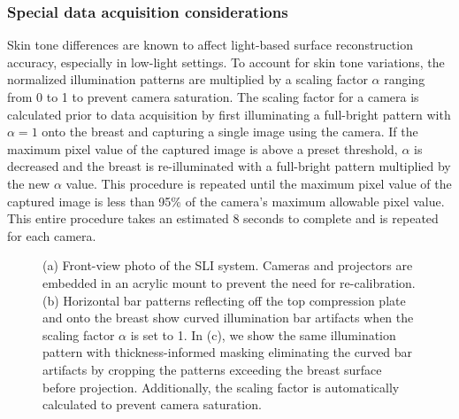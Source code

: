 \subsubsection{Special data acquisition considerations}\label{sec:special}
Skin tone differences are known to affect light-based surface reconstruction accuracy, especially in low-light settings. To account for skin tone variations, the normalized illumination patterns are multiplied by a scaling factor $\alpha$ ranging from 0 to 1 to prevent camera saturation. The scaling factor for a camera is calculated prior to data acquisition by first illuminating a full-bright pattern with $\alpha=1$ onto the breast and capturing a single image using the camera. If the maximum pixel value of the captured image is above a preset threshold, $\alpha$ is decreased and the breast is re-illuminated with a full-bright pattern multiplied by the new $\alpha$ value. This procedure is repeated until the maximum pixel value of the captured image is less than 95\% of the camera's maximum allowable pixel value. This entire procedure takes an estimated 8 seconds to complete and is repeated for each camera.

\begin{figure}
	\begin{center}
	\end{center}
	\caption{(a) Front-view photo of the SLI system. Cameras and projectors are embedded in an acrylic mount to prevent the need for re-calibration. (b) Horizontal bar patterns reflecting off the top compression plate and onto the breast show curved illumination bar artifacts when the scaling factor $\alpha$ is set to 1. In (c), we show the same illumination pattern with thickness-informed masking eliminating the curved bar artifacts by cropping the patterns exceeding the breast surface before projection. Additionally, the scaling factor is automatically calculated to prevent camera saturation.} 
	\label{fig:barartifacts}
\end{figure} 

